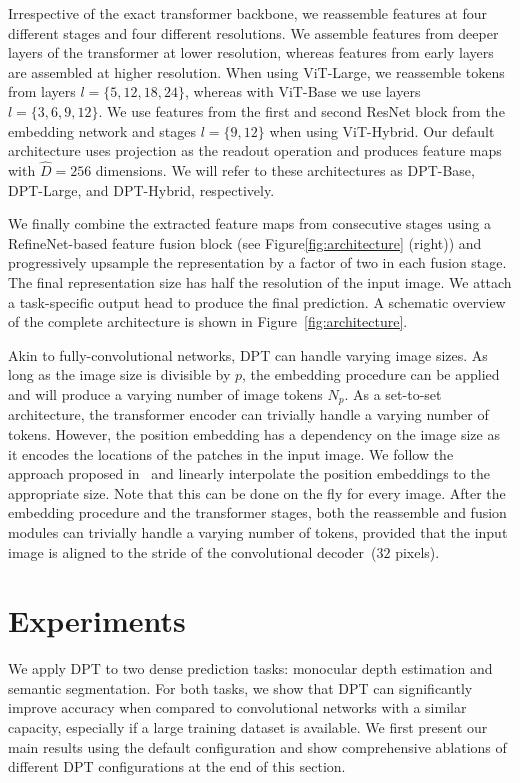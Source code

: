 \documentclass[10pt,twocolumn,letterpaper]{article}
\begin{document}
Irrespective of the exact transformer backbone, we reassemble features at four
different stages and four different resolutions. We assemble features from
deeper layers of the transformer at lower resolution, whereas features from
early layers are assembled at higher resolution. When using ViT-Large, we
reassemble tokens from layers $l =\{5, 12, 18, 24\}$, whereas with ViT-Base we
use layers $l =\{3, 6, 9, 12\}$. We use features from the first and second
ResNet block from the embedding network and stages $l =\{9, 12\}$ when using
ViT-Hybrid. Our default architecture uses projection as the readout operation
and produces feature maps with $\hat D = 256$ dimensions. We will refer to these
architectures as {DPT-Base}, {DPT-Large}, and {DPT-Hybrid}, respectively.

We finally combine the extracted feature maps from consecutive stages using a
RefineNet-based feature fusion block \cite{Lin2017,Xian2018} (see
Figure\ref{fig:architecture} (right)) and progressively upsample the
representation by a factor of two in each fusion stage. The final representation
size has half the resolution of the input image. We attach a task-specific
output head to produce the final prediction. A schematic overview of the
complete architecture is shown in Figure~\ref{fig:architecture}.


 Akin to fully-convolutional networks, DPT
can handle varying image sizes. As long as the image size is divisible by $p$,
the embedding procedure can be applied and will produce a varying number of
image tokens $N_{p}$. As a set-to-set architecture, the transformer encoder can
trivially handle a varying number of tokens. However, the position embedding has
a dependency on the image size as it encodes the locations of the patches in the
input image. We follow the approach proposed in~\cite{Dosovitskiy2020} and
linearly interpolate the position embeddings to the appropriate size. Note that
this can be done on the fly for every image. After the embedding procedure and
the transformer stages, both the reassemble and fusion modules can trivially
handle a varying number of tokens, provided that the input image is aligned to
the stride of the convolutional decoder~($32$ pixels).


\section{Experiments}
We apply DPT to two dense prediction tasks: monocular depth estimation
and semantic segmentation. For both tasks, we show that DPT can significantly
improve accuracy when compared to convolutional networks with a similar
capacity, especially if a large training dataset is available. We first present
our main results using the default configuration and show comprehensive
ablations of different DPT configurations at the end of this section.
\end{document}
